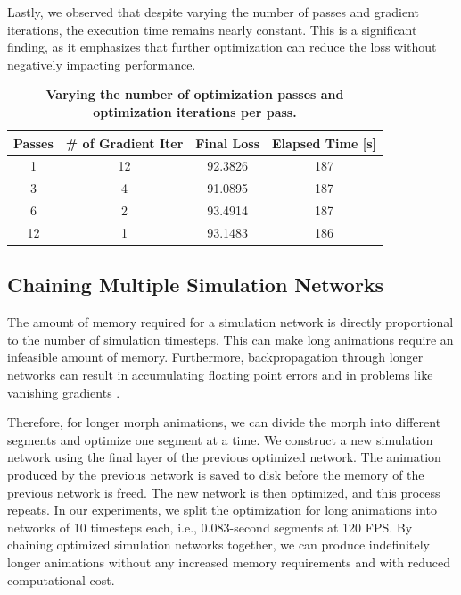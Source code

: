     Lastly, we observed that despite varying the number of passes and gradient iterations, the execution time remains nearly constant. This is a significant finding, as it emphasizes that further optimization can reduce the loss without negatively impacting performance.
    
    \begin{table}[ht!]
        \centering
        \small
        \caption[{Varying the number of optimization passes and optimization iterations per pass}]{\textbf{Varying the number of optimization passes and optimization iterations per pass.}}
        \begin{tabular}{cccc}
        \toprule
        Passes & \# of Gradient Iter & Final Loss & Elapsed Time [s] \\
        \midrule
        1   & 12 & 92.3826 & 187 \\
        3   & 4  & 91.0895 & 187 \\
        6   & 2  & 93.4914 & 187 \\
        12  & 1  & 93.1483 & 186 \\
        \bottomrule
        \end{tabular}
        \label{tab:multipass}
    \end{table}
    
\subsection{Chaining Multiple Simulation Networks}
    The amount of memory required for a simulation network is directly proportional to the number of simulation timesteps.
    This can make long animations require an infeasible amount of memory.
    Furthermore, backpropagation through longer networks can result in accumulating floating point errors and in problems like vanishing gradients \citep{hochreiter1998vanishing}. 

    Therefore, for longer morph animations, we can divide the morph into different segments and optimize one segment at a time.
    We construct a new simulation network using the final layer of the previous optimized network.
    The animation produced by the previous network is saved to disk before the memory of the previous network is freed.
    The new network is then optimized, and this process repeats.
    In our experiments, we split the optimization for long animations into networks of 10 timesteps each, i.e., 0.083-second segments at 120 FPS.
    By chaining optimized simulation networks together, we can produce indefinitely longer animations without any increased memory requirements and with reduced computational cost.

